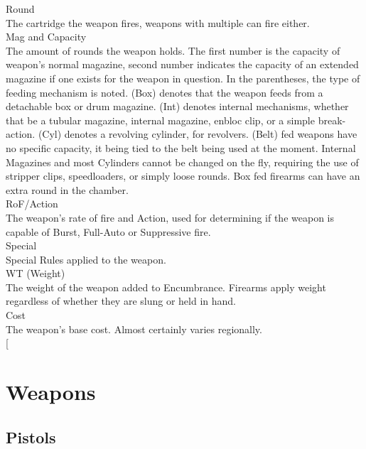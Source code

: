 \documentclass[a4paper, twocolumn, openany]{book}
\newlength{\indentlen}
\newcommand{\tabto}[1]{\setlength{\leftskip}{#1\indentlen}}
\begin{document}
{Round\\
The cartridge the weapon fires, weapons with multiple can fire either.\\

Mag and Capacity\\
The amount of rounds the weapon holds. The first number is the capacity of weapon’s normal
magazine, second number indicates the capacity of an extended magazine if one exists for the
weapon in question. In the parentheses, the type of feeding mechanism is noted. (Box) denotes
that the weapon feeds from a detachable box or drum magazine. (Int) denotes internal
mechanisms, whether that be a tubular magazine, internal magazine, enbloc clip, or a simple
break-action. (Cyl) denotes a revolving cylinder, for revolvers. (Belt) fed weapons have no
specific capacity, it being tied to the belt being used at the moment. Internal Magazines and
most Cylinders cannot be changed on the fly, requiring the use of stripper clips, speedloaders,
or simply loose rounds. Box fed firearms can have an extra round in the chamber.\\

RoF/Action\\
The weapon’s rate of fire and Action, used for determining if the weapon is capable of Burst,
Full-Auto or Suppressive fire.\\

Special\\
Special Rules applied to the weapon.\\

WT (Weight)\\
The weight of the weapon added to Encumbrance. Firearms apply weight regardless of whether
they are slung or held in hand.\\

Cost\\
The weapon’s base cost. Almost certainly varies regionally.\\

\tabto{0}
\twocolumn[{ 
	\section{Weapons}
	\subsection{Pistols}

}}
\end{document}
